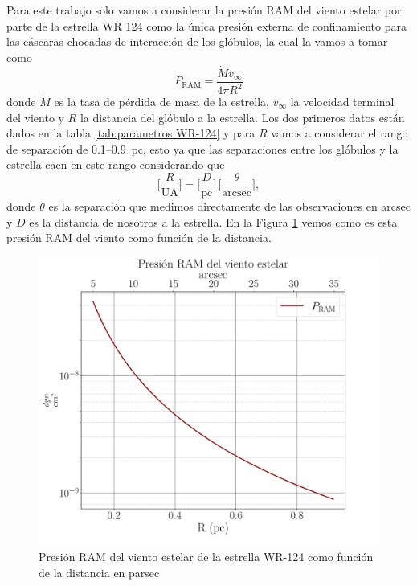 \documentclass{book}
\begin{document}
Para este trabajo solo vamos a considerar la presión RAM del viento estelar por parte de la estrella WR 124 como la única presión externa de confinamiento para las cáscaras chocadas de interacción de los glóbulos, la cual la vamos a tomar como \begin{equation}
 P_\mathrm{RAM}= \frac{\dot{M}v_\infty}{4\pi R^2}    
\end{equation}
donde $\dot{M}$ es la tasa de pérdida de masa de la estrella, $v_\infty$ la velocidad terminal del viento y $R$ la distancia del glóbulo a la estrella. Los dos primeros datos están dados en la tabla \ref{tab:parametros WR-124} y para $R$ vamos a considerar el rango de separación de 0.1--\SI{0.9}{pc}, esto ya que las separaciones entre los glóbulos y la estrella caen en este rango considerando que
\begin{equation}
    \Big[\frac{R}{\mathrm{UA}}\Big] = \Big[\frac{D}{\mathrm{pc}}\Big]\,\Big[\frac{\theta}{\mathrm{arcsec}}\Big],
\end{equation}
donde $\theta$ es la separación que medimos directamente de las observaciones en arcsec y $D$ es la distancia de nosotros a la estrella. En la Figura \ref{P_RAM} vemos como es esta presión RAM del viento como función de la distancia.

\begin{figure}[htb]
    \centering    \includegraphics[width=\textwidth]{imagenes_corregidas/PRAMcgs.pdf}
    \caption{Presión RAM del viento estelar de la estrella WR-124 como función de la distancia en parsec}
    \label{P_RAM}
\end{figure}
\end{document}
